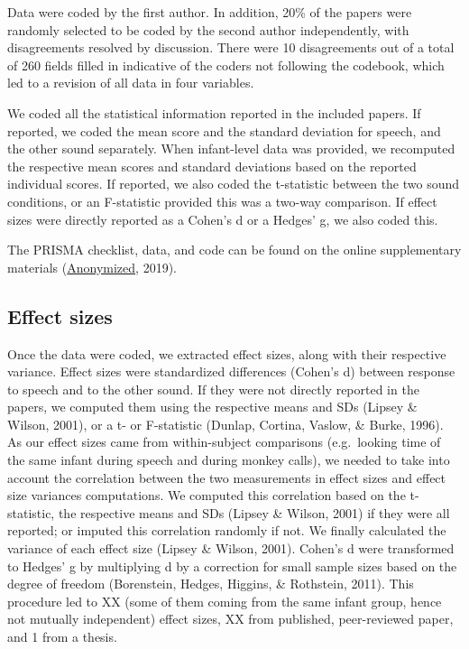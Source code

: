 \documentclass[man]{apa6}
\begin{document}
Data were coded by the first author. In addition, 20\% of the papers
were randomly selected to be coded by the second author independently,
with disagreements resolved by discussion. There were 10 disagreements
out of a total of 260 fields filled in indicative of the coders not
following the codebook, which led to a revision of all data in four
variables.

We coded all the statistical information reported in the included
papers. If reported, we coded the mean score and the standard deviation
for speech, and the other sound separately. When infant-level data was
provided, we recomputed the respective mean scores and standard
deviations based on the reported individual scores. If reported, we also
coded the t-statistic between the two sound conditions, or an
F-statistic provided this was a two-way comparison. If effect sizes were
directly reported as a Cohen's d or a Hedges' g, we also coded this.

The PRISMA checklist, data, and code can be found on the online
supplementary materials
(\href{https://osf.io/4stz9/?view_only=d0696591ebf34bfc8430f848cd945ca8}{Anonymized},
2019).

\subsection{Effect sizes}\label{effect-sizes}

Once the data were coded, we extracted effect sizes, along with their
respective variance. Effect sizes were standardized differences (Cohen's
d) between response to speech and to the other sound. If they were not
directly reported in the papers, we computed them using the respective
means and SDs (Lipsey \& Wilson, 2001), or a t- or F-statistic (Dunlap,
Cortina, Vaslow, \& Burke, 1996). As our effect sizes came from
within-subject comparisons (e.g.~looking time of the same infant during
speech and during monkey calls), we needed to take into account the
correlation between the two measurements in effect sizes and effect size
variances computations. We computed this correlation based on the
t-statistic, the respective means and SDs (Lipsey \& Wilson, 2001) if
they were all reported; or imputed this correlation randomly if not. We
finally calculated the variance of each effect size (Lipsey \& Wilson,
2001). Cohen's d were transformed to Hedges' g by multiplying d by a
correction for small sample sizes based on the degree of freedom
(Borenstein, Hedges, Higgins, \& Rothstein, 2011). This procedure led to
XX (some of them coming from the same infant group, hence not mutually
independent) effect sizes, XX from published, peer-reviewed paper, and 1
from a thesis.
\end{document}
